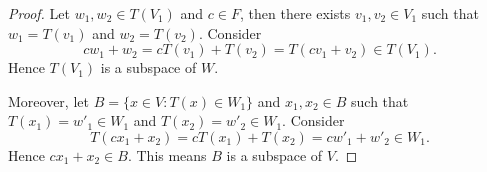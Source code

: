 \begin{Exercise}
\begin{proof}
Let $w_1, w_2\in T(V_1)$ and $c\in F$, then there exists $v_1, v_2\in V_1$ such that $w_1 = T(v_1)$ and $w_2 = T(v_2)$. Consider
$$
c w_1+w_2 = c T(v_1) + T(v_2) = T(c v_1 + v_2) \in T(V_1).
$$
Hence $T(V_1)$ is a subspace of $W$.

Moreover, let $B = \{x\in V: T(x)\in W_1\}$ and $x_1, x_2\in B$ such that $T(x_1) = w'_1\in W_1$ and $T(x_2) = w'_2\in W_1$. Consider
$$
T(c x_1 + x_2) = c T(x_1) + T(x_2) = c w'_1 + w'_2 \in W_1.
$$
Hence $c x_1 + x_2\in B$. This means $B$ is a subspace of $V$.
\end{proof}
\end{Exercise}